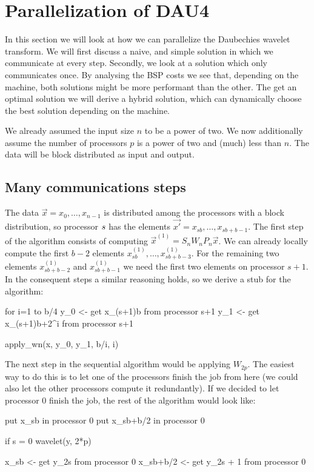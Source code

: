 
\section{Parallelization of DAU4}
\label{sec:par}

In this section we will look at how we can parallelize the Daubechies wavelet transform. We will first discuss a naive, and simple solution in which we communicate at every step. Secondly, we look at a solution which only communicates once. By analysing the BSP costs we see that, depending on the machine, both solutions might be more performant than the other. The get an optimal solution we will derive a hybrid solution, which can dynamically choose the best solution depending on the machine.

We already assumed the input size $n$ to be a power of two. We now additionally assume the number of processors $p$ is a power of two and (much) less than $n$. The data will be block distributed as input and output.

\subsection{Many communications steps}
The data $\vec{x} = x_0, \ldots, x_{n-1}$ is distributed among the processors with a block distribution, so processor $s$ has the elements $\vec{x'} = x_{sb}, \ldots, x_{sb+b-1}$. The first step of the algorithm consists of computing $\vec{x}^{(1)} = S_n W_n P_n \vec{x}$. We can already locally compute the first $b-2$ elements $x^{(1)}_{sb}, \ldots, x^{(1)}_{sb+b-3}$. For the remaining two elements $x^{(1)}_{sb+b-2}$ and $x^{(1)}_{sb+b-1}$ we need the first two elements on processor $s+1$. In the consequent steps a similar reasoning holds, so we derive a stub for the algorithm:

\begin{lstlistings}
for i=1 to b/4
	y_0 <- get x_{(s+1)b} from processor s+1
	y_1 <- get x_{(s+1)b+2^i} from processor s+1

	apply_wn(x, y_0, y_1, b/i, i)
\end{lstlistings}

The next step in the sequential algorithm would be applying $W_{2p}$. The easiest way to do this is to let one of the processors finish the job from here (we could also let the other processors compute it redundantly). If we decided to let processor 0 finish the job, the rest of the algorithm would look like:

\begin{lstlistings}
put x_{sb} in processor 0
put x_{sb+b/2} in processor 0

if s = 0
	wavelet(y, 2*p)

x_{sb} <- get y_{2s} from processor 0
x_{sb+b/2} <- get y_{2s + 1} from processor 0
\end{lstlistings}

